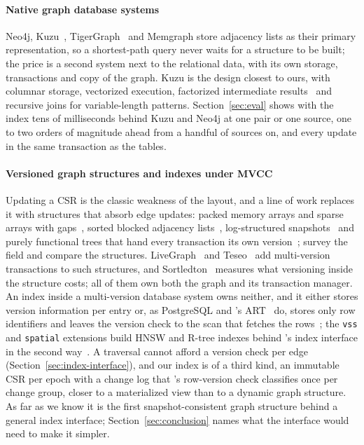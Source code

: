 \paragraph{Native graph database systems}
Neo4j, Kuzu~\cite{feng2023kuzu}, TigerGraph~\cite{deutsch2019tigergraph} and Memgraph store adjacency lists as
their primary representation, so a shortest-path query never waits for a structure to be built; the price is a second
system next to the relational data, with its own storage, transactions and copy of the graph. Kuzu is the design
closest to ours, with columnar storage, vectorized execution, factorized intermediate results~\cite{gupta2021columnar} and recursive joins for
variable-length patterns. Section~\ref{sec:eval} shows \duckpgq with the index tens of milliseconds behind Kuzu
and Neo4j at one pair or one source, one to two orders of magnitude ahead from a handful of sources on, and every
update in the same transaction as the tables.

\paragraph{Versioned graph structures and indexes under MVCC}
Updating a CSR is the classic weakness of the layout, and a line of work replaces it with structures that absorb
edge updates: packed memory arrays and sparse arrays with gaps~\cite{wheatman2018pcsr,deleo2021teseo}, sorted blocked
adjacency lists~\cite{fuchs2022sortledton}, log-structured snapshots~\cite{macko2015llama} and purely functional trees
that hand every transaction its own version~\cite{dhulipala2019aspen}; \citet{besta2023dynamic} survey the field and
\citet{deleo2019pma} compare the structures. LiveGraph~\cite{zhu2020livegraph} and Teseo~\cite{deleo2021teseo} add
multi-version transactions to such structures, and Sortledton~\cite{fuchs2022sortledton} measures what versioning
inside the structure costs; all of them own both the graph and its transaction manager. An index inside a multi-version database system owns neither, and it either stores version information per entry
or, as PostgreSQL and \duckdb's ART~\cite{leis2013art} do, stores only row identifiers and leaves the version check to
the scan that fetches the rows~\cite{wu2017mvcc,neumann2015mvcc}; the \texttt{vss} and \texttt{spatial} extensions
build HNSW and R-tree indexes behind \duckdb's index interface in the second way~\cite{duckdb_vss,duckdb_spatial}. A
traversal cannot afford a version check per edge (Section~\ref{sec:index-interface}), and our index is of a third kind,
an immutable CSR per epoch with a change log that \duckdb's row-version check classifies once per change group, closer
to a materialized view than to a dynamic graph structure. As far as we know it is the first snapshot-consistent graph
structure behind a general index interface; Section~\ref{sec:conclusion} names what the interface would need to make it
simpler.
